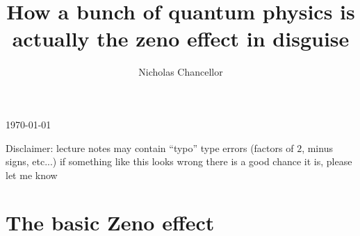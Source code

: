 \documentclass[english]{article}
\begin{document}
\title{How a bunch of quantum physics is actually the zeno effect in disguise}
\author{Nicholas Chancellor}


\maketitle



\today %


{\small Disclaimer: lecture notes may contain ``typo'' type errors (factors of $2$, minus signs, etc...) if something like this looks wrong there is a good chance it is, please let me know}

\section{The basic Zeno effect}
\end{document}
